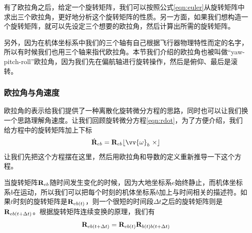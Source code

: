 \documentclass[11pt]{article}
\begin{document}
有了欧拉角之后，给定一个旋转矩阵，我们可以按照公式\ref{eqn:euler}从旋转矩阵中求出三个欧拉角，更好地分析这个旋转矩阵的性质。另一方面，如果我们想构造一个旋转矩阵，就可以先设定三个想要的欧拉角，然后计算出所需的旋转矩阵。

另外，因为在机体坐标系中我们的三个轴有自己根据飞行器物理特性而定的名字，所以有时候我们也用三个轴来指代欧拉角。本节我们介绍的欧拉角也被叫做“yaw-pitch-roll”欧拉角，因为我们先在偏航轴进行旋转操作，然后是俯仰、最后是滚转。

\subsubsection{欧拉角与角速度}\label{sec:eulerandangular}
欧拉角的表示给我们提供了一种离散化旋转微分方程的思路，同时也可以让我们换一个思路理解角速度。让我们回顾旋转微分方程\ref{eqn:rdot}，为了方便介绍，我们给方程中的旋转矩阵加上下标
$$
\dot{{\bf R}}_{eb} = {\bf R}_{eb}\lfloor \vv{\omega}_b \ \times \rfloor
$$
让我们先把这个方程摆在这里，然后用欧拉角和导数的定义重新推导一下这个方程。

当旋转矩阵${\bf R}_{eb}$随时间发生变化的时候，因为大地坐标系$e$始终静止，而机体坐标系$b$在运动，所以我们可以把每个时刻的机体坐标系$b$加上与时间相关的描述符。如果$t$时刻的旋转矩阵是${\bf R}_{eb(t)}$，则一个很短的时间段$\Delta t$之后的旋转矩阵则是${\bf R}_{eb(t+\Delta t)}$。根据旋转矩阵连续变换的原理，我们有
\begin{equation}\label{eqn:discreterot}
{\bf R}_{eb(t+\Delta t)} = {\bf R}_{eb(t)}{\bf R}_{b(t)b(t+\Delta t)}
\end{equation}
\end{document}
